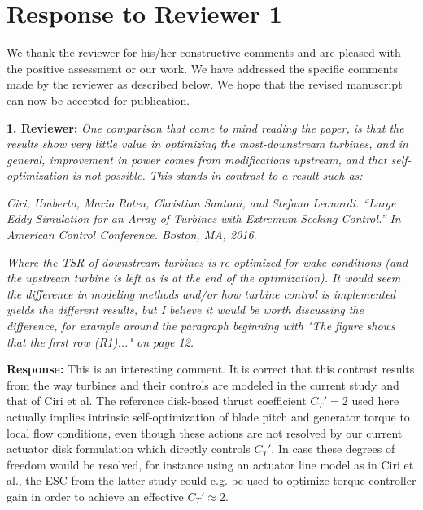 \documentclass[]{article}
\begin{document}


\section*{Response to Reviewer 1}

We thank the reviewer for his/her constructive comments and are pleased with the positive assessment or our work. We have addressed the specific comments made by the reviewer as described below. We hope that the revised manuscript can now be accepted for publication.

\dotfill

\textbf{1. Reviewer:} \textit{One comparison that came to mind reading the paper, is that the results show very little value in optimizing the most-downstream turbines, and in general, improvement in power comes from modifications upstream, and that self-optimization is not possible. This stands in contrast to a result such as:}
	
\textit{Ciri, Umberto, Mario Rotea, Christian Santoni, and Stefano Leonardi. “Large Eddy Simulation for an Array of Turbines with Extremum Seeking Control.” In American Control Conference. Boston, MA, 2016. }
	
\textit{Where the TSR of downstream turbines is re-optimized for wake conditions (and the upstream turbine is left as is at the end of the optimization). It would seem the difference in modeling methods and/or how turbine control is implemented yields the different results, but I believe it would be worth discussing the difference, for example around the paragraph beginning with "The figure shows that the first row (R1)..." on page 12.}

\textbf{Response:} This is an interesting comment. It is correct that this contrast results from the way turbines and their controls are modeled in the current study and that of Ciri et al. The reference disk-based thrust coefficient $C_T' = 2$ used here actually implies intrinsic self-optimization of blade pitch and generator torque to local flow conditions, even though these actions are not resolved by our current actuator disk formulation which directly controls $C_T'$. In case these degrees of freedom would be resolved, for instance using an actuator line model as in Ciri et al., the ESC from the latter study could e.g. be used to optimize torque controller gain in order to achieve an effective $C_T' \approx 2$. 
\end{document}
